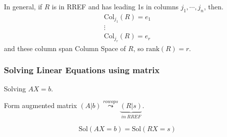 \documentclass[12pt]{article}
\newcommand{\rank}{\mathrm{rank}}
\newcommand{\Col}{\mathrm{Col}}
\newcommand{\Sol}{\mathrm{Sol}}
\begin{document}
In general, if $R$ is in RREF and has leading 1s in columns $j_1,\cdots, j_n$,
then.
\begin{align*}
	\Col_{j_1}(R) = e_1	\\
	\vdots \\
	\Col_{j_r}(R) = e_r
\end{align*}
and these column span Column Space of $R$, so $\rank(R) = r$. 


\subsubsection{Solving Linear Equations using matrix}
Solving $AX = b$. 

Form augmented matrix $(A|b) \overset{row ops}{\leadsto} 
\underbrace{(R|s)}_{in \ RREF}$. 

\[
	\Sol(AX = b) = \Sol(RX = s)
\]
\end{document}
